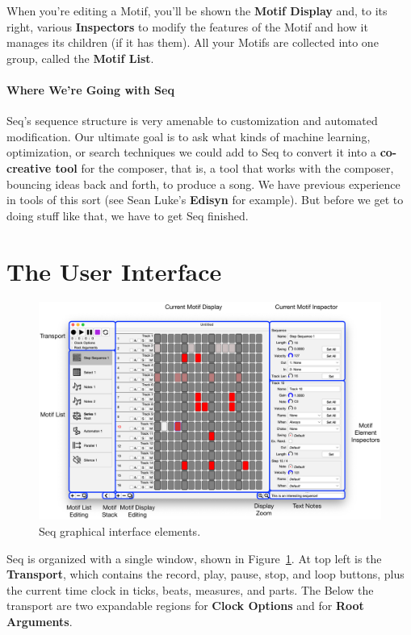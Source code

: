 \documentclass[twoside,10pt]{article}
\begin{document}
When you're editing a Motif, you'll be shown the {\bf Motif Display} and, to its right, various {\bf Inspectors} to modify the features of the Motif and how it manages its children (if it has them).  All your Motifs are collected into one group, called the {\bf Motif List}.

\paragraph{Where We're Going with Seq}

Seq's sequence structure is very amenable to customization and automated modification.  Our ultimate goal is to ask what kinds of machine learning, optimization, or search techniques we could add to Seq to convert it into a {\bf co-creative tool} for the composer, that is, a tool that works with the composer, bouncing ideas back and forth, to produce a song.  We have previous experience in tools of this sort (see Sean Luke's {\bf Edisyn} for example).  But before we get to doing stuff like that, we have to get Seq finished.

\clearpage\section{The User Interface}

\begin{figure}[b]
\centering
\includegraphics[width=6.5in]{MotifDisplay.pdf}
\caption{Seq graphical interface elements.}
\label{gui}
\end{figure}

Seq is organized with a single window, shown in Figure~\ref{gui}.  At top left is the {\bf Transport}, which contains the record, play, pause, stop, and loop buttons, plus the current time clock in ticks, beats, measures, and parts.  The Below the transport are two expandable regions for {\bf Clock Options} and for {\bf Root Arguments}.
\end{document}
